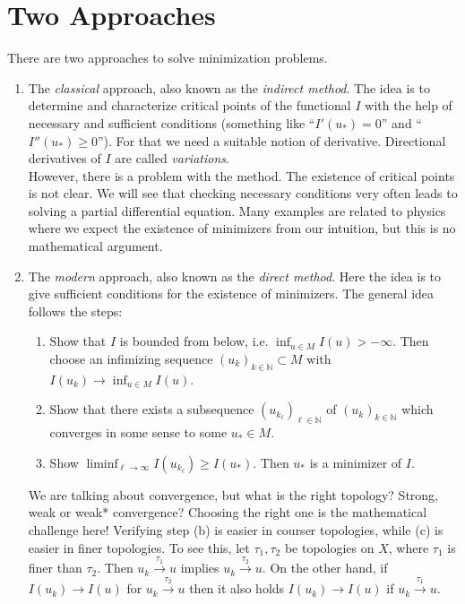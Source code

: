 \section{Two Approaches}
There are two approaches to solve minimization problems.
\begin{enumerate}
	\item The \textit{classical} approach, also known as the \textit{indirect method}. The idea is to determine and characterize critical points of the functional $I$ with the help of necessary and sufficient conditions (something like ``$I'(u_*)=0$'' and ``$I''(u_*)\geq0$''). For that we need a suitable notion of derivative. Directional derivatives of $I$ are called \textit{variations}.\\

	However, there is a problem with the method. The existence of critical points is not clear. We will see that checking necessary conditions very often leads to solving a partial differential equation. Many examples are related to physics where we expect the existence of minimizers from our intuition, but this is no mathematical argument.
	\item The \textit{modern} approach, also known as the \textit{direct method}. Here the idea is to give sufficient conditions for the existence of minimizers. The general idea follows the steps:
	\begin{enumerate}
		\item Show that $I$ is bounded from below, i.e. $\inf_{u\in M}{I(u)}>-\infty$. Then choose an infimizing sequence $(u_k)_{k\in\mathbb{N}}\subset M$ with $I(u_k)\to\inf_{u\in M}{I(u)}$.
		\item Show that there exists a subsequence $(u_{k_\ell})_{\ell\in\mathbb{N}}$ of $(u_k)_{k\in\mathbb{N}}$ which converges in some sense to some $u_*\in M$.
		\item Show $\liminf_{\ell\to\infty}{I(u_{k_\ell})}\geq I(u_*)$. Then $u_*$ is a minimizer of $I$.
	\end{enumerate}
	We are talking about convergence, but what is the right topology? Strong, weak or weak* convergence? Choosing the right one is the mathematical challenge here! Verifying step (b) is easier in courser topologies, while (c) is easier in finer topologies. To see this, let $\tau_1,\tau_2$ be topologies on $X$, where $\tau_1$ is finer than $\tau_2$. Then $u_k\overset{\tau_1}{\to}u$ implies $u_k\overset{\tau_2}{\to}u$. On the other hand, if $I(u_k)\to I(u)$ for $u_k\overset{\tau_2}{\to}u$ then it also holds $I(u_k)\to I(u)$ if $u_k\overset{\tau_1}{\to}u$.\\[11pt]
\end{enumerate}


